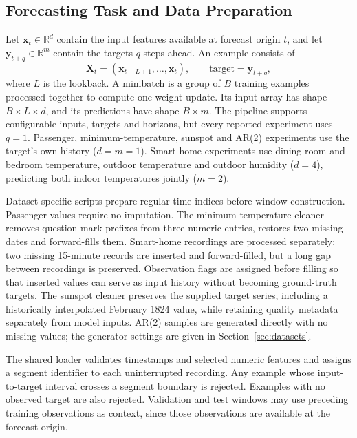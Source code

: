 \subsection{Forecasting Task and Data Preparation}
Let $\mathbf{x}_t\in\mathbb{R}^{d}$ contain the input features available at
forecast origin $t$, and let $\mathbf{y}_{t+q}\in\mathbb{R}^{m}$ contain the
targets $q$ steps ahead. An example consists of
\begin{equation}
 \mathbf{X}_t=(\mathbf{x}_{t-L+1},\ldots,\mathbf{x}_t),
 \qquad \text{target}=\mathbf{y}_{t+q},
\end{equation}
where $L$ is the lookback. A minibatch is a group of $B$ training examples
processed together to compute one weight update. Its input array has shape $B\times L\times d$, and its
predictions have shape $B\times m$. The pipeline supports configurable inputs,
targets and horizons, but every reported experiment uses $q=1$. Passenger,
minimum-temperature, sunspot and AR(2) experiments use the target's own history
($d=m=1$).
Smart-home experiments use dining-room and bedroom temperature,
outdoor temperature and outdoor humidity ($d=4$), predicting both indoor
temperatures jointly ($m=2$).

Dataset-specific scripts prepare regular time indices before window construction.
Passenger values require no imputation. The minimum-temperature cleaner removes
question-mark prefixes from three numeric entries, restores two missing dates
and forward-fills them. Smart-home recordings are processed separately: two
missing 15-minute records are inserted and forward-filled, but a long gap
between recordings is preserved. Observation flags are assigned before filling so
that inserted values can serve as input history without becoming ground-truth
targets. The sunspot cleaner preserves the supplied target series, including a
historically interpolated February 1824 value, while retaining quality metadata
separately from model inputs. AR(2) samples are generated directly with no
missing values; the generator settings are given in Section~\ref{sec:datasets}.

The shared loader validates timestamps and selected numeric features and assigns
a segment identifier to each uninterrupted recording. Any example whose
input-to-target interval crosses a segment boundary is rejected. Examples with no
observed target are also rejected. Validation and test windows may use preceding training
observations as context, since those observations are available at the forecast
origin.

